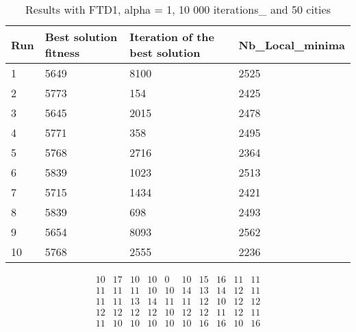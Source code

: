 \documentclass[12pt,oneside,a4paper]{article}
\begin{document}
\begin{table}[h]
  \centering
  \small
  \begin{tabular}{llll}
    \hline
    \multicolumn{1}{|l|}{\textbf{Run}}& \multicolumn{1}{l|}{\textbf{Best solution fitness}}& \multicolumn{1}{l|}{\textbf{Iteration of the best solution}}& \multicolumn{1}{l|}{\textbf{Nb\_Local\_minima}}\\ \hline
    \multicolumn{1}{|l|}{1} & \multicolumn{1}{l|}{5649}  & \multicolumn{1}{l|}{8100} & \multicolumn{1}{l|}{2525}  \\ \hline
    \multicolumn{1}{|l|}{2} & \multicolumn{1}{l|}{5773}  & \multicolumn{1}{l|}{154} & \multicolumn{1}{l|}{2425}  \\ \hline
    \multicolumn{1}{|l|}{3} & \multicolumn{1}{l|}{5645}  & \multicolumn{1}{l|}{2015}  & \multicolumn{1}{l|}{2478}  \\ \hline
    \multicolumn{1}{|l|}{4} & \multicolumn{1}{l|}{5771}  & \multicolumn{1}{l|}{358}  & \multicolumn{1}{l|}{2495}  \\ \hline
    \multicolumn{1}{|l|}{5} & \multicolumn{1}{l|}{5768}  & \multicolumn{1}{l|}{2716}  & \multicolumn{1}{l|}{2364}  \\ \hline
    \multicolumn{1}{|l|}{6} & \multicolumn{1}{l|}{5839}  & \multicolumn{1}{l|}{1023}  & \multicolumn{1}{l|}{2513}  \\ \hline
    \multicolumn{1}{|l|}{7} & \multicolumn{1}{l|}{5715}  & \multicolumn{1}{l|}{1434}  & \multicolumn{1}{l|}{2421}  \\ \hline
    \multicolumn{1}{|l|}{8} & \multicolumn{1}{l|}{5839}  & \multicolumn{1}{l|}{698} & \multicolumn{1}{l|}{2493}  \\ \hline
    \multicolumn{1}{|l|}{9} & \multicolumn{1}{l|}{5654}  & \multicolumn{1}{l|}{8093} & \multicolumn{1}{l|}{2562}  \\ \hline
    \multicolumn{1}{|l|}{10} & \multicolumn{1}{l|}{5768}  & \multicolumn{1}{l|}{2555} & \multicolumn{1}{l|}{2236}  \\ \hline
  \end{tabular}
  \caption{Results with FTD1, alpha = 1, 10 000 iterations\_ and 50 cities}
\end{table}

\begin{equation}
  \tag{Mean Tabu Duration by city table 11}
  \begin{smallmatrix} 10 & 17 & 10 & 10 & 0 & 10 & 15 & 16 & 11 & 11 \\
                  11 & 11 & 11 & 10 & 10 & 14 & 13 & 14 & 12 & 11 \\
                  11 & 11 & 13 & 14 & 11 & 11 & 12 & 10 & 12 & 12 \\
                  12 & 12 & 12 & 12 & 10 & 12 & 12 & 11 & 12 & 11 \\
                  11 & 10 & 10 & 10 & 10 & 10 & 16 & 16 & 10 & 16
  \end{smallmatrix}
\end{equation}
\end{document}
